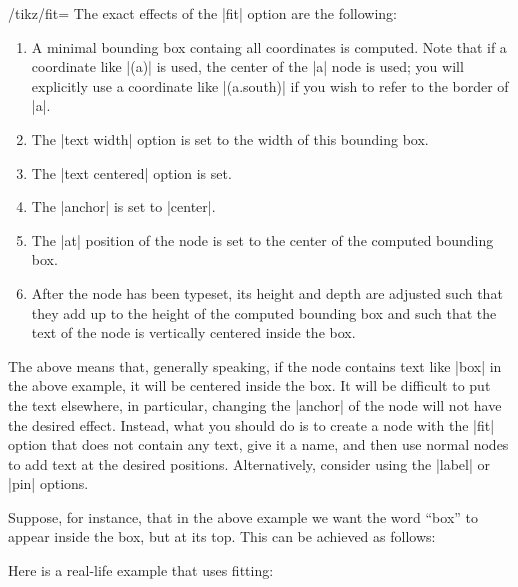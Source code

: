 \begin{key}{/tikz/fit=}
  The exact effects of the |fit| option are the following:
  \begin{enumerate}
  \item A minimal bounding box containg all coordinates is
    computed. Note that if a coordinate like |(a)| is used, the center
    of the |a| node is used; you will explicitly use a coordinate like
    |(a.south)| if you wish to refer to the border of |a|.
  \item The |text width| option is set to the width of this bounding box.
  \item The |text centered| option is set.
  \item The |anchor| is set to |center|.
  \item The |at| position of the node is set to the center of the
    computed bounding box.
  \item After the node has been typeset, its height and depth are
    adjusted such that they add up to the height of the computed
    bounding box and such that the text of the node is vertically
    centered inside the box.
  \end{enumerate}
  The above means that, generally speaking, if the node contains text
  like |box| in the above example, it will be centered inside the
  box. It will be difficult to put the text elsewhere, in particular,
  changing the |anchor| of the node will not have the desired
  effect. Instead, what you should do is to create a node with the
  |fit| option that does not contain any text, give it a name, and
  then use normal nodes to add text at the desired
  positions. Alternatively, consider using the |label| or |pin|
  options. 

  Suppose, for instance, that in the above example we want the word
  ``box'' to appear inside the box, but at its top. This can be
  achieved as follows: 
\begin{codeexample}[]
\end{codeexample}

  Here is a real-life example that uses fitting:


\end{key}

